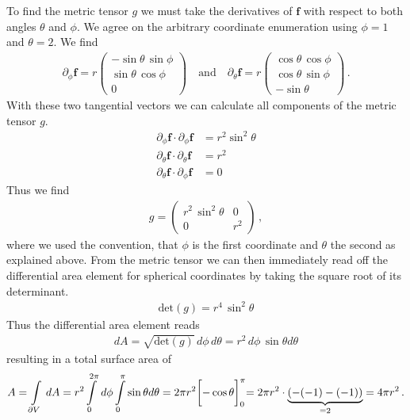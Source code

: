 \documentclass[11pt, DINA4, fleqn]{amsart}
\begin{document}
To find the metric tensor $g$ we must take the derivatives of $\boldsymbol{f}$ with respect to both angles $\theta$ and $\phi$. We agree on the arbitrary coordinate enumeration using $\phi = 1$ and $\theta = 2$.
We find
\begin{align}
\partial_{\phi}\boldsymbol{f} = r \begin{pmatrix}
-\sin\theta\, \sin\phi \\
\sin\theta\, \cos\phi \\
0
\end{pmatrix}
\quad \text{and} \quad
\partial_{\theta}\boldsymbol{f} = r \begin{pmatrix}
\cos\theta\, \cos\phi \\
\cos\theta\, \sin\phi \\
-\sin\theta
\end{pmatrix}
 \, .
\end{align}
With these two tangential vectors we can calculate all components of the metric tensor $g$.
\begin{align}
\partial_{\phi}\boldsymbol{f} \cdot \partial_{\phi}\boldsymbol{f} &= 
r^2\sin^2\theta \\
\partial_{\theta}\boldsymbol{f} \cdot \partial_{\theta}\boldsymbol{f} &= 
r^2 \\
\partial_{\theta}\boldsymbol{f}\cdot \partial_{\phi}\boldsymbol{f} &= 0
\end{align}
Thus we find
\begin{align}
g = \begin{pmatrix}
r^2\, \sin^2\theta & 0 \\
0 & r^2
\end{pmatrix} \, ,
\end{align}
where we used the convention, that $\phi$ is the first coordinate and $\theta$ the second as explained above.
From the metric tensor we can then immediately read off the differential area element for spherical coordinates by taking the square root of its determinant.
\begin{align}
\text{det}(g) = r^4\, \sin^2\theta
\end{align}
Thus the differential area element reads
\begin{align}
dA = \sqrt{\text{det}(g)} \, d\phi\, d\theta= r^2 \, d\phi \, \sin\theta d\theta
\end{align}
resulting in a total surface area of
\begin{align}
A = \int\displaylimits_{\partial V} \, dA =  r^2 \int\displaylimits_{0}^{2\pi}\, d\phi \int \displaylimits_{0}^{\pi} \sin\theta d\theta
= 2\pi r^2 \biggl[-\cos\theta\biggl]_{0}^{\pi} = 2\pi r^2 \cdot\underbrace{(-(-1)-(-1))}_{=2} = 4\pi r^2 \, .
\end{align}
\end{document}
